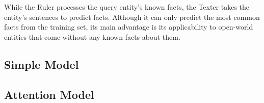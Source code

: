While the Ruler processes the query entity's known facts, the Texter takes the entity's sentences to predict facts. Although it can only predict the most common facts from the training set, its main advantage is its applicability to open-world entities that come without any known facts about them.

\subsection{Simple Model}
\label{subsec:4_approach/1_texter/1_simple_model}


\subsection{Attention Model}
\label{subsec:4_approach/1_texter/2_attention_model}

